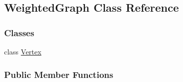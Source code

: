 \hypertarget{class_weighted_graph}{}\subsection{Weighted\+Graph Class Reference}
\label{class_weighted_graph}
\subsubsection*{Classes}
\begin{DoxyCompactItemize}
\item 
class \hyperlink{class_weighted_graph_1_1_vertex}{Vertex}
\end{DoxyCompactItemize}
\subsubsection*{Public Member Functions}
